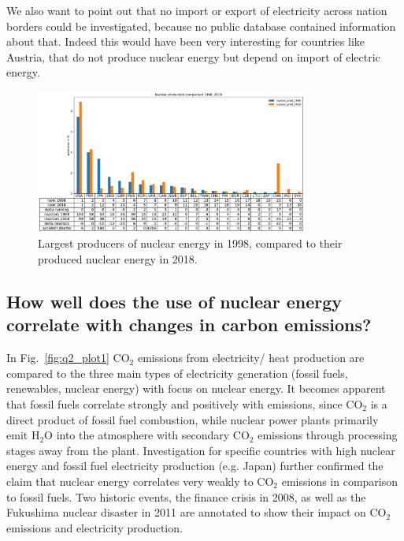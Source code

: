 \documentclass[a4paper,10pt,twocolumn]{scrartcl}
\begin{document}
We also want to point out that no import or export of electricity across nation borders could be investigated, because no public database contained information about that. Indeed this would have been very interesting for countries like Austria, that do not produce nuclear energy but depend on import of electric energy.

\begin{figure}[t]
	\centering
	\includegraphics[width=0.8\textwidth]{../figures/q1_plot2.pdf}
	\caption{Largest producers of nuclear energy in 1998, compared to their produced nuclear energy in 2018.}
	\label{fig:q2_plot2}
\end{figure}

\subsection{How well does the use of nuclear energy correlate with changes in carbon emissions?}
In Fig.~\ref{fig:q2_plot1} CO$_2$ emissions from electricity/ heat production are compared to the three main types of electricity generation (fossil fuels, renewables, nuclear energy) with focus on nuclear energy. It becomes apparent that fossil fuels correlate strongly and positively with emissions, since CO$_2$ is a direct product of fossil fuel combustion, while nuclear power plants primarily emit H$_2$O into the atmosphere with secondary CO$_2$ emissions through processing stages away from the plant. Investigation for specific countries with high nuclear energy and fossil fuel electricity production (e.g. Japan) further confirmed the claim that nuclear energy correlates very weakly to CO$_2$ emissions in comparison to fossil fuels. Two historic events, the finance crisis in 2008, as well as the Fukushima nuclear disaster in 2011 are annotated to show their impact on CO$_2$ emissions and electricity production.
\end{document}
